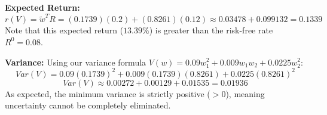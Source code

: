 \noindent \textbf{Expected Return:}
\[
r(V) = \tilde{w}^T R = (0.1739)(0.2) + (0.8261)(0.12) \approx 0.03478 + 0.099132 = 0.1339
\]
Note that this expected return ($13.39\%$) is greater than the risk-free rate $R^0 = 0.08$.

\noindent \textbf{Variance:}
Using our variance formula $V(w) = 0.09w_1^2 + 0.009w_1w_2 + 0.0225w_2^2$:
\[
Var(V) = 0.09(0.1739)^2 + 0.009(0.1739)(0.8261) + 0.0225(0.8261)^2
\]
\[
Var(V) \approx 0.00272 + 0.00129 + 0.01535 = 0.01936
\]
As expected, the minimum variance is strictly positive ($>0$), meaning uncertainty cannot be completely eliminated.